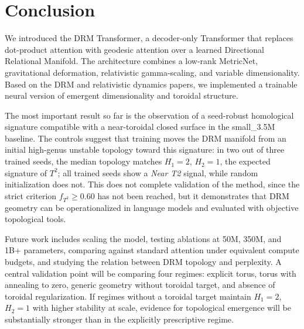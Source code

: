 \section{Conclusion}
\label{sec:conclusion}

We introduced the DRM Transformer, a decoder-only Transformer that replaces
dot-product attention with geodesic attention over a learned Directional
Relational Manifold. The architecture combines a low-rank MetricNet,
gravitational deformation, relativistic gamma-scaling, and variable
dimensionality. Based on the DRM and relativistic dynamics papers, we
implemented a trainable neural version of emergent dimensionality and toroidal
structure.

The most important result so far is the observation of a seed-robust
homological signature compatible with a near-toroidal closed surface in the
small\_3.5M baseline. The controls suggest that training moves the DRM manifold
from an initial high-genus unstable topology toward this signature: in two out
of three trained seeds, the median topology matches $H_1=2$, $H_2=1$, the
expected signature of $T^2$; all trained seeds show a \emph{Near T2} signal,
while random initialization does not. This does not complete validation of the
method, since the strict criterion $f_{T^2}\geq 0.60$ has not been reached, but
it demonstrates that DRM geometry can be operationalized in language models and
evaluated with objective topological tools.

Future work includes scaling the model, testing ablations at 50M, 350M, and
1B+ parameters, comparing against standard attention under equivalent compute
budgets, and studying the relation between DRM topology and perplexity. A
central validation point will be comparing four regimes: explicit torus, torus
with annealing to zero, generic geometry without toroidal target, and absence
of toroidal regularization. If regimes without a toroidal target maintain
$H_1=2$, $H_2=1$ with higher stability at scale, evidence for topological
emergence will be substantially stronger than in the explicitly prescriptive
regime.
